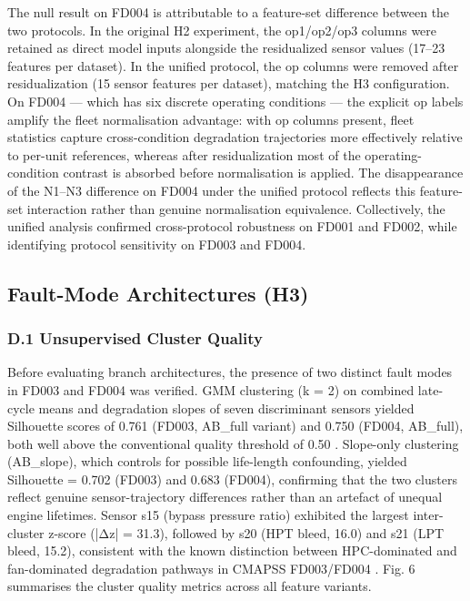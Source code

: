 \documentclass[review,12pt]{elsarticle}
\begin{document}
The null result on FD004 is attributable to a feature-set difference between the two protocols. In the original H2 experiment, the op1/op2/op3 columns were retained as direct model inputs alongside the residualized sensor values (17--23 features per dataset). In the unified protocol, the op columns were removed after residualization (15 sensor features per dataset), matching the H3 configuration. On FD004 --- which has six discrete operating conditions --- the explicit op labels amplify the fleet normalisation advantage: with op columns present, fleet statistics capture cross-condition degradation trajectories more effectively relative to per-unit references, whereas after residualization most of the operating-condition contrast is absorbed before normalisation is applied. The disappearance of the N1--N3 difference on FD004 under the unified protocol reflects this feature-set interaction rather than genuine normalisation equivalence. Collectively, the unified analysis confirmed cross-protocol robustness on FD001 and FD002, while identifying protocol sensitivity on FD003 and FD004.

\subsection{Fault-Mode Architectures (H3)}

\subsubsection{D.1 Unsupervised Cluster Quality}

Before evaluating branch architectures, the presence of two distinct fault modes in FD003 and FD004 was verified. GMM clustering (k = 2) on combined late-cycle means and degradation slopes of seven discriminant sensors yielded Silhouette scores of 0.761 (FD003, AB_full variant) and 0.750 (FD004, AB_full), both well above the conventional quality threshold of 0.50 \cite{ref35}. Slope-only clustering (AB_slope), which controls for possible life-length confounding, yielded Silhouette = 0.702 (FD003) and 0.683 (FD004), confirming that the two clusters reflect genuine sensor-trajectory differences rather than an artefact of unequal engine lifetimes. Sensor s15 (bypass pressure ratio) exhibited the largest inter-cluster z-score (|Δz| = 31.3), followed by s20 (HPT bleed, 16.0) and s21 (LPT bleed, 15.2), consistent with the known distinction between HPC-dominated and fan-dominated degradation pathways in CMAPSS FD003/FD004 \cite{ref36}. Fig. 6 summarises the cluster quality metrics across all feature variants.
\end{document}
